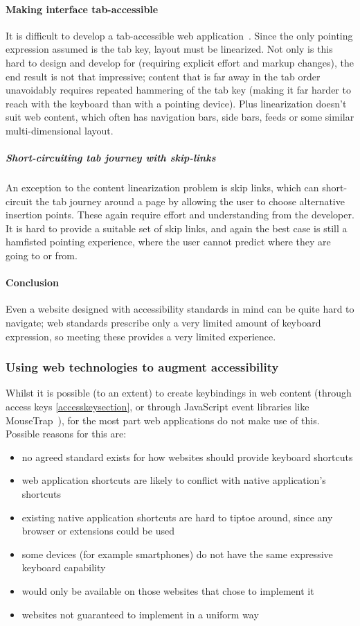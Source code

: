 \documentclass[11pt,openright,a4paper]{report}
\begin{document}
\paragraph{Making interface tab-accessible}
   It is difficult to develop a tab-accessible web application~\cite{watanabe2012using}. Since the only pointing expression assumed is the tab key, layout must be linearized. Not only is this hard to design and develop for (requiring explicit effort and markup changes), the end result is not that impressive; content that is far away in the tab order unavoidably requires repeated hammering of the tab key (making it far harder to reach with the keyboard than with a pointing device). Plus linearization doesn't suit web content, which often has navigation bars, side bars, feeds or some similar multi-dimensional layout.
\subparagraph{Short-circuiting tab journey with skip-links}
\label{sec:skiplinks}
  An exception to the content linearization problem is skip links, which can short-circuit the tab journey around a page by allowing the user to choose alternative insertion points. These again require effort and understanding from the developer. It is hard to provide a suitable set of skip links, and again the best case is still a hamfisted pointing experience, where the user cannot predict where they are going to or from.
\paragraph{Conclusion}
  Even a website designed with accessibility standards in mind can be quite hard to navigate; web standards prescribe only a very limited amount of keyboard expression, so meeting these provides a very limited experience.

\subsubsection{Using web technologies to augment accessibility}
  Whilst it is possible (to an extent) to create \glspl{keybinding} in web content (through access keys \cref{accesskeysection}, or through JavaScript event libraries like MouseTrap~\cite{Mousetrap}), for the most part web applications do not make use of this. Possible reasons for this are:

\begin{itemize}
 \item no agreed standard exists for how websites should provide keyboard shortcuts
 \item web application shortcuts are likely to conflict with native application's shortcuts
 \item existing native application shortcuts are hard to tiptoe around, since any browser or extensions could be used
 \item some devices (for example smartphones) do not have the same expressive keyboard capability
 \item would only be available on those websites that chose to implement it
 \item websites not guaranteed to implement in a uniform way
\end{itemize}
\end{document}
